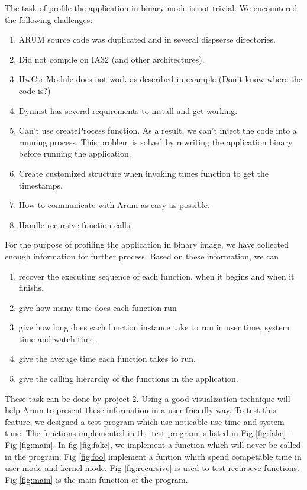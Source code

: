 \documentclass[11pt,letterpaper,oneside]{article}
\begin{document}
The task of profile the application in binary mode is not trivial. We encountered the following challenges:
\begin{enumerate}
\item ARUM source code was duplicated and in several dispserse directories.  
\item Did not compile on IA32 (and other architectures).
\item HwCtr Module does not work as described in example (Don't know where the code is?)
\item Dyninst has several requirements to install and get working.
\item Can't use createProcess function. As a result, we can't inject the code into a running process. This problem is solved by rewriting the application binary before running the application.
\item Create customized structure when invoking times function to get the timestamps.
\item How to communicate with Arum as easy as possible.
\item Handle recursive function calls.
\end{enumerate}

For the purpose of profiling the application in binary image, we have collected enough information for further process. Based on these information, we can
\begin{enumerate}
\item recover the executing sequence of each function, when it begins and when it finishs.
\item give how many time does each function run
\item give how long does each function instance take to run in user time, system time and watch time.
\item give the average time each function takes to run.
\item give the calling hierarchy of the functions in the application.
\end{enumerate}
These task can be done by project 2. Using a good visualization technique will help Arum to present these information in a user friendly way.
\newline
To test this feature, we designed a test program which use noticable use time and system time. The functions implemented in the test program is listed in Fig \ref{fig:fake} - Fig \ref{fig:main}. In fig \ref{fig:fake}, we implement a function which will never be called in the program. Fig \ref{fig:foo} implement a funtion which spend competable time in user mode and kernel mode. Fig \ref{fig:recursive} is used to test recurseve functions. Fig \ref{fig:main} is the main function of the program.
\end{document}
